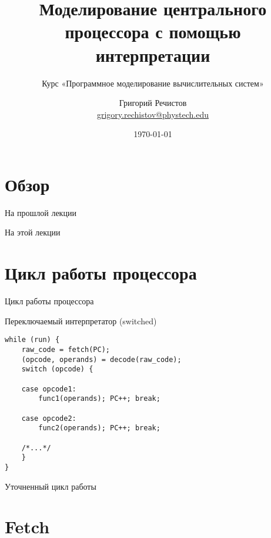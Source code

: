 \documentclass{beamer}
\title{Моделирование центрального процессора с помощью интерпретации}
\subtitle{Курс «Программное моделирование вычислительных систем»}
\author[]{Григорий Речистов \\ \small{\href{mailto:grigory.rechistov@phystech.edu}{grigory.rechistov@phystech.edu}}}
\date{\today}
\begin{document}
\begin{frame}
    \maketitle
\end{frame}

\section*{Обзор}

\begin{frame}{На прошлой лекции}
\end{frame}


\begin{frame}{На этой лекции}
\tableofcontents
\end{frame} 


\section{Цикл работы процессора}

\begin{frame}{Цикл работы процессора}
\centering

\end{frame}

\begin{frame}[fragile]{Переключаемый интерпретатор (switched)}
\begin{verbatim}
while (run) {
    raw_code = fetch(PC);
    (opcode, operands) = decode(raw_code);
    switch (opcode) {

    case opcode1:
        func1(operands); PC++; break;

    case opcode2:
        func2(operands); PC++; break;

    /*...*/
    }
}
\end{verbatim}
\end{frame}


\begin{frame}{Уточненный цикл работы}
\centering



\end{frame}


\section{Fetch}
\end{document}
